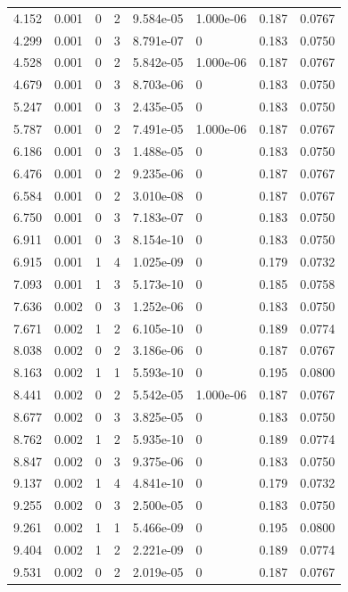 \documentclass[preview]{standalone}
\begin{document}
{{\begin{tabular}{L{1.2cm}C{1.2cm} C{0.3cm}C{0.5cm} C{1.4cm}C{1.4cm} C{1.4cm}C{1.4cm}}
  4.152  &  0.001  & 0     &  2 &  9.584e-05  & 1.000e-06  & 0.187 &  0.0767   \\ 
  4.299  &  0.001  & 0     &  3 &  8.791e-07  & 0  & 0.183 &  0.0750   \\ 
  4.528  &  0.001  & 0     &  2 &  5.842e-05  & 1.000e-06  & 0.187 &  0.0767   \\ 
  4.679  &  0.001  & 0     &  3 &  8.703e-06  & 0  & 0.183 &  0.0750   \\ 
  5.247  &  0.001  & 0     &  3 &  2.435e-05  & 0  & 0.183 &  0.0750   \\ 
  5.787  &  0.001  & 0     &  2 &  7.491e-05  & 1.000e-06  & 0.187 &  0.0767   \\ 
  6.186  &  0.001  & 0     &  3 &  1.488e-05  & 0  & 0.183 &  0.0750   \\ 
  6.476  &  0.001  & 0     &  2 &  9.235e-06  & 0  & 0.187 &  0.0767   \\ 
  6.584  &  0.001  & 0     &  2 &  3.010e-08  & 0  & 0.187 &  0.0767   \\ 
  6.750  &  0.001  & 0     &  3 &  7.183e-07  & 0  & 0.183 &  0.0750   \\ 
  6.911  &  0.001  & 0     &  3 &  8.154e-10  & 0  & 0.183 &  0.0750   \\ 
  6.915  &  0.001  & 1     &  4 &  1.025e-09  & 0  & 0.179 &  0.0732   \\ 
  7.093  &  0.001  & 1     &  3 &  5.173e-10  & 0  & 0.185 &  0.0758   \\ 
  7.636  &  0.002  & 0     &  3 &  1.252e-06  & 0  & 0.183 &  0.0750   \\ 
  7.671  &  0.002  & 1     &  2 &  6.105e-10  & 0  & 0.189 &  0.0774   \\ 
  8.038  &  0.002  & 0     &  2 &  3.186e-06  & 0  & 0.187 &  0.0767   \\ 
  8.163  &  0.002  & 1     &  1 &  5.593e-10  & 0  & 0.195 &  0.0800   \\ 
  8.441  &  0.002  & 0     &  2 &  5.542e-05  & 1.000e-06  & 0.187 &  0.0767   \\ 
  8.677  &  0.002  & 0     &  3 &  3.825e-05  & 0  & 0.183 &  0.0750   \\ 
  8.762  &  0.002  & 1     &  2 &  5.935e-10  & 0  & 0.189 &  0.0774   \\ 
  8.847  &  0.002  & 0     &  3 &  9.375e-06  & 0  & 0.183 &  0.0750   \\ 
  9.137  &  0.002  & 1     &  4 &  4.841e-10  & 0  & 0.179 &  0.0732   \\ 
  9.255  &  0.002  & 0     &  3 &  2.500e-05  & 0  & 0.183 &  0.0750   \\ 
  9.261  &  0.002  & 1     &  1 &  5.466e-09  & 0  & 0.195 &  0.0800   \\ 
  9.404  &  0.002  & 1     &  2 &  2.221e-09  & 0  & 0.189 &  0.0774   \\ 
  9.531  &  0.002  & 0     &  2 &  2.019e-05  & 0  & 0.187 &  0.0767   \\ 
\hline 
\end{tabular} 

}}
\end{document}

